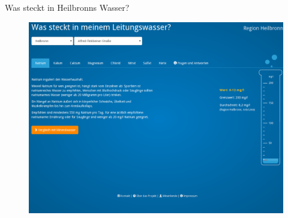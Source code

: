 \begin{frame}[t]{Was steckt in Heilbronns Wasser?}
\begin{figure}[h]
 \centering
 \includegraphics[scale=0.21]{section_other_ok_labs_water_quality.png}
\end{figure}
\end{frame}

